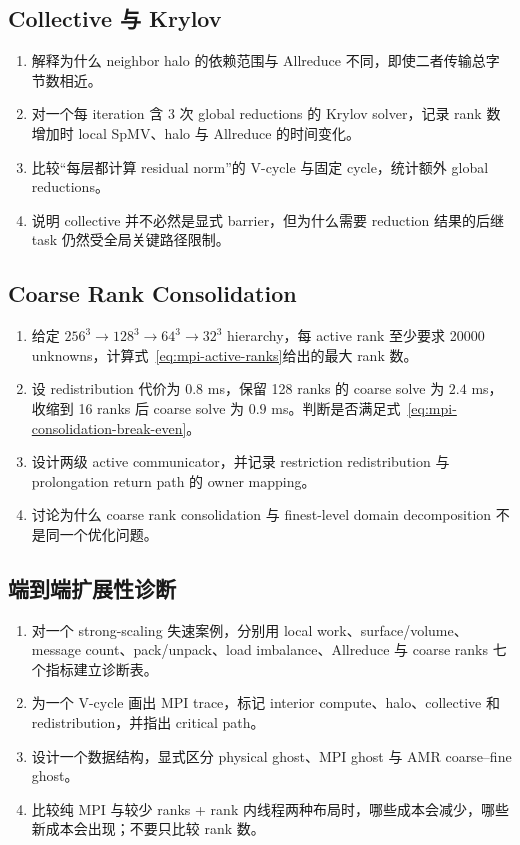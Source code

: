 \subsection*{Collective 与 Krylov}
\begin{enumerate}[label=\arabic*.]
\item 解释为什么 neighbor halo 的依赖范围与 Allreduce 不同，即使二者传输总字节数相近。
\item 对一个每 iteration 含 3 次 global reductions 的 Krylov solver，记录 rank 数增加时 local SpMV、halo 与 Allreduce 的时间变化。
\item 比较“每层都计算 residual norm”的 V-cycle 与固定 cycle，统计额外 global reductions。
\item 说明 collective 并不必然是显式 barrier，但为什么需要 reduction 结果的后继 task 仍然受全局关键路径限制。
\end{enumerate}

\subsection*{Coarse Rank Consolidation}
\begin{enumerate}[label=\arabic*.]
\item 给定 $256^3\rightarrow128^3\rightarrow64^3\rightarrow32^3$ hierarchy，每 active rank 至少要求 20000 unknowns，计算式~\eqref{eq:mpi-active-ranks}给出的最大 rank 数。
\item 设 redistribution 代价为 $0.8$ ms，保留 128 ranks 的 coarse solve 为 $2.4$ ms，收缩到 16 ranks 后 coarse solve 为 $0.9$ ms。判断是否满足式~\eqref{eq:mpi-consolidation-break-even}。
\item 设计两级 active communicator，并记录 restriction redistribution 与 prolongation return path 的 owner mapping。
\item 讨论为什么 coarse rank consolidation 与 finest-level domain decomposition 不是同一个优化问题。
\end{enumerate}

\subsection*{端到端扩展性诊断}
\begin{enumerate}[label=\arabic*.]
\item 对一个 strong-scaling 失速案例，分别用 local work、surface/volume、message count、pack/unpack、load imbalance、Allreduce 与 coarse ranks 七个指标建立诊断表。
\item 为一个 V-cycle 画出 MPI trace，标记 interior compute、halo、collective 和 redistribution，并指出 critical path。
\item 设计一个数据结构，显式区分 physical ghost、MPI ghost 与 AMR coarse--fine ghost。
\item 比较纯 MPI 与较少 ranks + rank 内线程两种布局时，哪些成本会减少，哪些新成本会出现；不要只比较 rank 数。
\end{enumerate}
